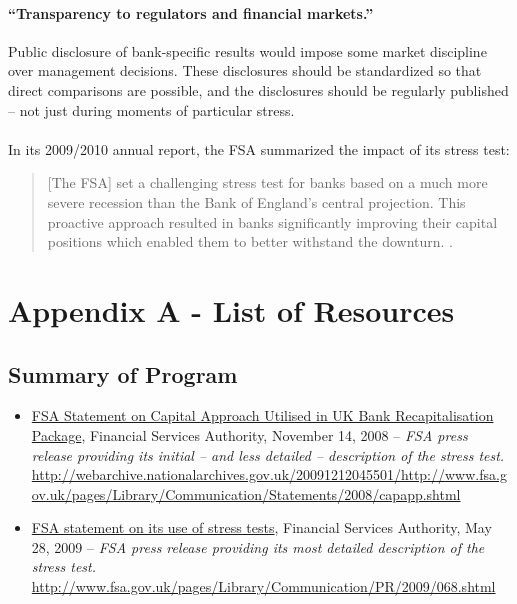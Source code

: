 \documentclass[12pt]{article}
\begin{document}
\paragraph{``Transparency to regulators and financial markets.''} Public disclosure of bank-specific results would impose some market discipline over management decisions. These disclosures should be standardized so that direct comparisons are possible, and the disclosures should be regularly published -- not just during moments of particular stress.

\paragraph{}In its 2009/2010 annual report, the FSA summarized the impact of its stress test:

\begin{quote}
[The FSA] set a challenging stress test for banks based on a much more severe recession than the Bank of England's central projection. This proactive approach resulted in banks significantly improving their capital positions which enabled them to better withstand the downturn. \citep{FSAReport}.
\end{quote}


\newpage
{}


\nocite{*}


\newpage


\section{Appendix A - List of Resources}

\subsection{Summary of Program}

\begin{itemize}
\item
\ul{FSA Statement on Capital Approach Utilised in UK Bank Recapitalisation Package}, Financial Services Authority, November 14, 2008 -- \emph{FSA press release providing its initial -- and less detailed -- description of the stress test.} \url{http://webarchive.nationalarchives.gov.uk/20091212045501/http://www.fsa.gov.uk/pages/Library/Communication/Statements/2008/capapp.shtml}
\item
\ul{FSA statement on its use of stress tests}, Financial Services Authority, May 28, 2009 -- \emph{FSA press release providing its most detailed description of the stress test.} \url{http://www.fsa.gov.uk/pages/Library/Communication/PR/2009/068.shtml}
\end{itemize}
\end{document}
